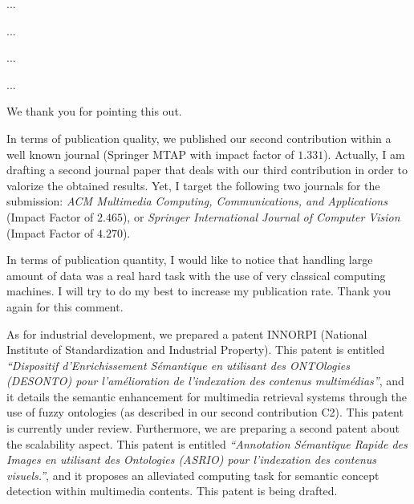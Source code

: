 \answer ...



\answer ...


\answer ...


\answer ...



\answer We thank you for pointing this out. 

	In terms of publication quality, we published our second contribution within a well known journal 
	(Springer MTAP with impact factor of $1.331$). Actually, I am drafting a second journal paper that 
	deals with our third contribution in order to valorize the obtained results. 
	Yet, I target the following two journals for the submission:
	\textit{ACM Multimedia Computing, Communications, and Applications} (Impact Factor of $2.465$),
	or \textit{Springer International Journal of Computer Vision} (Impact Factor of $4.270$).

	In terms of publication quantity, I would like to notice that handling large amount of data was a 
	real hard task with the use of very classical computing machines. I will try to do my best to 
	increase my publication rate. Thank you again for this comment.

	As for industrial development, we prepared a patent  INNORPI (National Institute of 
	Standardization and Industrial Property). This patent is entitled \textit{“Dispositif d'Enrichissement 
	Sémantique en utilisant des ONTOlogies (DESONTO) pour l'amélioration de l'indexation des 
	contenus multimédias”}, and it details the semantic enhancement for multimedia retrieval systems 
	through the use of fuzzy ontologies (as described in our second contribution C2). 
	This patent is currently under review. 
	Furthermore, we are preparing a second patent about the scalability aspect. 
	This patent is entitled \textit{“Annotation Sémantique Rapide des Images en utilisant des Ontologies 
	(ASRIO) pour l'indexation des contenus visuels.”}, 
	and it proposes an alleviated computing task for semantic concept detection within multimedia contents. 
	This patent is being drafted.

